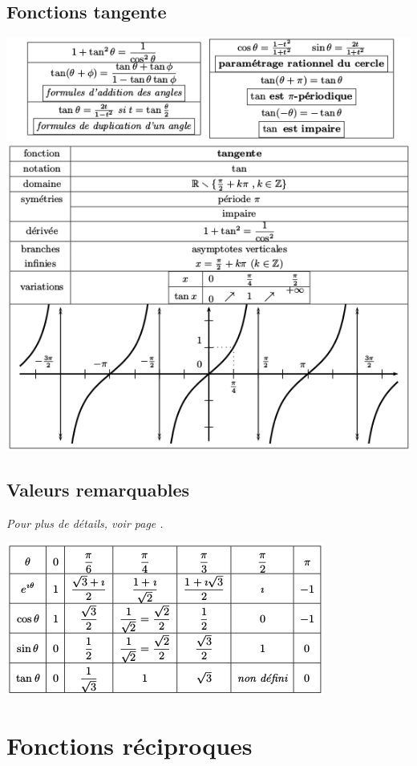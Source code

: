 \documentclass[a4paper,10pt]{book}
\begin{document}
\subsection{Fonctions tangente}
\begin{center}
\includegraphics[scale=0.78]{images/009.png}
\end{center}

\subsection{Valeurs remarquables}
\emph{Pour plus de détails, voir page \pageref{Cercle trigo}.}
\begin{center}
\includegraphics[scale=0.75]{images/007.png}
\end{center}
\newpage

\section*{Fonctions réciproques}
\end{document}
